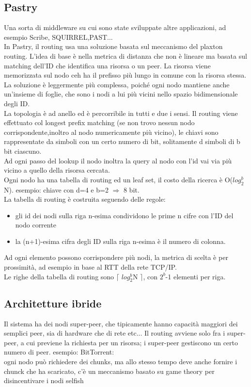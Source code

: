 \documentclass{article}
\begin{document}
\subsection{Pastry}
Una sorta di middleware su cui sono state sviluppate altre applicazioni, ad esempio Scribe, SQUIRREL,PAST...\\ In Pastry, il routing usa una soluzione basata sul meccanismo del plaxton routing. L'idea di base è nella metrica di distanza che non è lineare ma basata sul matching dell'ID che identifica una risorsa o un peer. La risorsa viene memorizzata sul nodo ceh ha il prefisso più lungo in comune con la risorsa stessa.\\ La soluzione è leggermente più complessa, poiché ogni nodo mantiene anche un'insieme di foglie, che sono i nodi a lui più vicini nello spazio bidimensionale degli ID.\\ La topologia è ad anello ed è percorribile in tutti e due i sensi. Il routing viene effettuato col longest prefix matching (se non trovo nessun nodo corrispondente,inoltro al nodo numericamente più vicino), le chiavi sono rappresentate da simboli con un certo numero di bit, solitamente d simboli di b bit ciascuno.\\ Ad ogni passo del lookup il nodo inoltra la query al nodo con l'id vai via più vicino a quello della risorsa cercata.\\ Ogni nodo ha una tabella di routing ed un leaf set, il costo della ricerca è O($log^b_{2}$N).
esempio: chiave con d=4 e b=2 $\Rightarrow$ 8 bit.\\ La tabella di routing è costruita seguendo delle regole:
\begin{itemize}
\item gli id dei nodi sulla riga n-esima condividono le prime n cifre con l'ID del nodo corrente
\item la (n+1)-esima cifra degli ID sulla riga n-esima è il numero di colonna.
\end{itemize}
Ad ogni elemento possono corrispondere più nodi, la metrica di scelta è per prossimità, ad esempio in base al RTT della rete TCP/IP.\\ Le righe della tabella di routing sono $\lceil$ $log^b_{2}$N $\rceil$, con $2^b$-1 elementi per riga.
\subsection{Architetture ibride}
Il sistema ha dei nodi super-peer, che tipicamente hanno capacità maggiori dei semplici peer, sia di hardware che di rete etc... Il routing avviene solo fra i super-peer, a cui previene la richiesta per un risorsa; i super-peer gestiscono un certo numero di peer. esempio: BitTorrent:\\ ogni nodo può richiedere dei chunks, ma allo stesso tempo deve anche fornire i chunck che ha scaricato, c'è un meccanismo basato su game theory per disincentivare i nodi selfish
\end{document}

